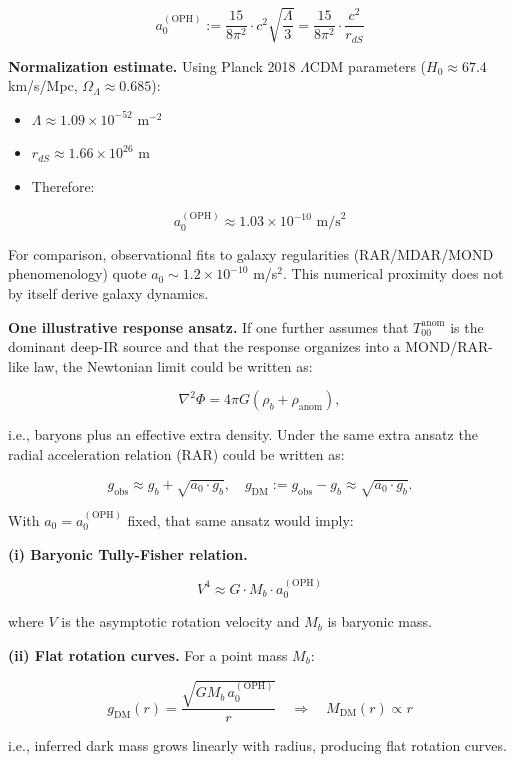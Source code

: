 \[
\boxed{
a_0^{\mathrm{(OPH)}} := \frac{15}{8\pi^2} \cdot c^2 \sqrt{\frac{\Lambda}{3}}
= \frac{15}{8\pi^2} \cdot \frac{c^2}{r_{dS}}
}
\]

\textbf{Normalization estimate.} Using Planck 2018 \(\Lambda\)CDM parameters (\(H_0 \approx 67.4\) km/s/Mpc, \(\Omega_\Lambda \approx 0.685\)):

\begin{itemize}
\tightlist
\item
  \(\Lambda \approx 1.09 \times 10^{-52}\) m\(^{-2}\)
\item
  \(r_{dS} \approx 1.66 \times 10^{26}\) m
\item
  Therefore:
\end{itemize}

\[
\boxed{
a_0^{\mathrm{(OPH)}} \approx 1.03 \times 10^{-10} \text{ m/s}^2
}
\]

For comparison, observational fits to galaxy regularities (RAR/MDAR/MOND phenomenology) quote \(a_0 \sim 1.2 \times 10^{-10}\) m/s\(^2\). This numerical proximity does not by itself derive galaxy dynamics.

\textbf{One illustrative response ansatz.} If one further assumes that \(T_{00}^{\mathrm{anom}}\) is the dominant deep-IR source and that the response organizes into a MOND/RAR-like law, the Newtonian limit could be written as:

\[
\nabla^2 \Phi = 4\pi G (\rho_b + \rho_{\mathrm{anom}}),
\]

i.e., baryons plus an effective extra density. Under the same extra ansatz the radial acceleration relation (RAR) could be written as:

\[
g_{\mathrm{obs}} \approx g_b + \sqrt{a_0 \cdot g_b},
\quad
g_{\mathrm{DM}} := g_{\mathrm{obs}} - g_b \approx \sqrt{a_0 \cdot g_b}.
\]

With \(a_0 = a_0^{\mathrm{(OPH)}}\) fixed, that same ansatz would imply:

\textbf{(i) Baryonic Tully-Fisher relation.}

\[
V^4 \approx G \cdot M_b \cdot a_0^{\mathrm{(OPH)}}
\]

where \(V\) is the asymptotic rotation velocity and \(M_b\) is baryonic mass.

\textbf{(ii) Flat rotation curves.} For a point mass \(M_b\):

\[
g_{\mathrm{DM}}(r) = \frac{\sqrt{G M_b \, a_0^{\mathrm{(OPH)}}}}{r}
\quad \Rightarrow \quad
M_{\mathrm{DM}}(r) \propto r
\]

i.e., inferred dark mass grows linearly with radius, producing flat rotation curves.

